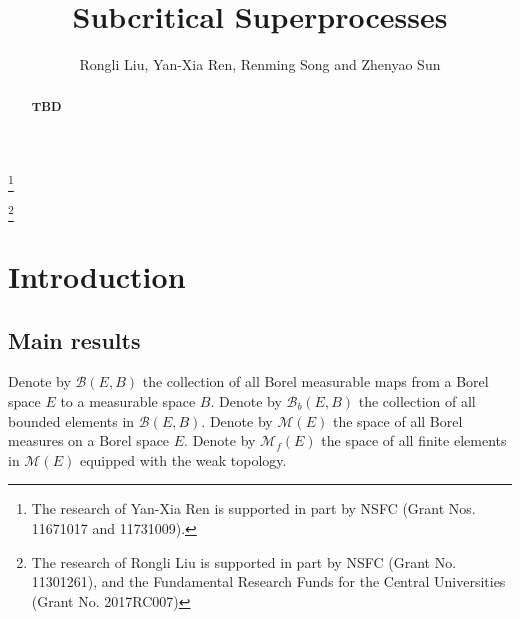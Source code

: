 \documentclass[12pt,a4paper]{amsart}
\numberwithin{equation}{section}
\theoremstyle{plain}
\theoremstyle{definition}
\begin{document}
\title {Subcritical Superprocesses }
\author
[R. Liu, Y.-X. Ren, R. Song and Z. Sun]
{Rongli Liu, Yan-Xia Ren, Renming Song and Zhenyao Sun}
\address{
  Yan-Xia Ren\\
  School of Mathematical Sciences\\
  Peking University\\
  Beijing, P. R. China, 100871}
\thanks{
  The research of Yan-Xia Ren is supported in part by NSFC (Grant Nos. 11671017 and 11731009).}
\address{
  Rongli Liu\\
  Information about Rongli Liu}
\thanks{
  The research of Rongli Liu is supported in part by NSFC
  (Grant No. 11301261), and the Fundamental Research Funds for the Central Universities (Grant No.  2017RC007)}
\address{
  Renming Song\\
  Information about Renming Song}
\address{
  Zhenyao Sun\\
  School of Mathematical Sciences\\
  Peking University\\
  Beijing, P. R. China, 100871}
\begin{abstract}
{\bf TBD}
\end{abstract}
\maketitle
\section{Introduction}
\subsection{Main results}
\label{sec:IR}
Denote by $\mathcal B(E,B)$ the collection of all Borel measurable maps from a Borel space $E$ to a measurable space $B$.
Denote by $\mathcal B_b(E,B)$ the collection of all bounded elements in $\mathcal B(E,B)$.
Denote by $\mathcal M(E)$ the space of all Borel measures on a Borel space $E$. 
Denote by $\mathcal M_f(E)$ the space of all finite elements in $\mathcal M(E)$ equipped with the weak topology. 
\end{document}
